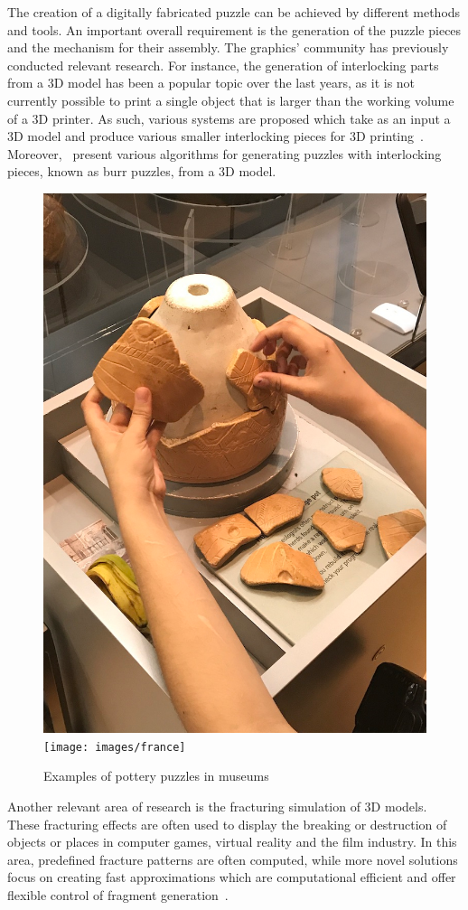 \documentclass[acmlarge,screen,dvipsnames]{acmart}
\begin{document}
%
The creation of a digitally fabricated puzzle can be achieved by
different methods and tools. An important overall requirement is the
generation of the puzzle pieces and the mechanism for their
assembly. The graphics' community has previously conducted relevant
research. For instance, the generation of interlocking parts from a 3D
model has been a popular topic over the last years, as it is not
currently possible to print a single object that is larger than the
working volume of a 3D printer. As such, various systems are proposed
which take as an input a 3D model and produce various smaller
interlocking pieces for 3D
printing~\cite{Song:2015:POI:2797416.2797510,luo_chopper:_2012,klein_interlocking_2014,skouras_interactive_2015}. Moreover,~\cite{Xin:2011:MBP:2010324.1964992,Song:2012:RIP:2366145.2366147,sun_computational_2015}
present various algorithms for generating puzzles with interlocking
pieces, known as burr puzzles, from a 3D model.
%
\begin{figure}[b]
  \centering
  {\includegraphics[width=0.35\linewidth]{images/uk}}
  \hspace{0.5in}
  {\texttt{[image: images/france]}}
  \caption{\label{fig:puz}Examples of pottery puzzles in museums}
\end{figure}

Another relevant area of research is the fracturing simulation of 3D
models. These fracturing effects are often used to display the
breaking or destruction of objects or places in computer games,
virtual reality and the film industry. In this area, predefined
fracture patterns are often computed, while more novel solutions focus
on creating fast approximations which are computational efficient and
offer flexible control of fragment
generation~\cite{Schvartzman:2014:FAB:2556700.2556713,Hahn:2016:FAB:2897824.2925902,Zhu:2015:SRB:2809654.2766942,Muller:2013:RTD:2461912.2461934}.
\end{document}
